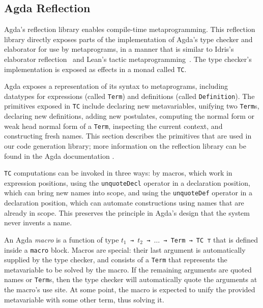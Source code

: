 \documentclass[runningheads]{llncs}
\begin{document}
\subsection{Agda Reflection}
\label{sec:sec2.2}
Agda's reflection library enables compile-time metaprogramming.
This reflection library directly exposes parts of the implementation of Agda's type checker and elaborator for use by metaprograms, in a manner that is similar to Idris's elaborator reflection~\cite{davidphd,David-2016} and Lean's tactic metaprogramming~\cite{Ebner2017}.
The type checker's implementation is exposed as effects in a monad called \texttt{TC}.

Agda exposes a representation of its syntax to metaprograms, including datatypes for expressions (called \texttt{Term}) and definitions (called \texttt{Definition}).
The primitives exposed in \texttt{TC} include declaring new metavariables, unifying two \texttt{Term}s, declaring new definitions, adding new postulates, computing the normal form or weak head normal form of a \texttt{Term}, inspecting the current context, and constructing fresh names.
This section describes the primitives that are used in our code generation library; more information on the reflection library can be found in the Agda documentation \cite{Agda-doc-2017}.

\texttt{TC} computations can be invoked in three ways: by macros, which work in expression positions, using the \texttt{unquoteDecl} operator in a declaration position, which can bring new names into scope, and using the \texttt{unquoteDef} operator in a declaration position, which can automate constructions using names that are already in scope.
This preserves the principle in Agda's design that the system never invents a name.

An Agda \emph{macro} is a function of type {\tt $t_1$ → $t_2$ → $\ldots$ → Term → TC ⊤} that is defined inside a \texttt{macro} block.
Macros are special: their last argument is automatically supplied by the type checker, and consists of a \texttt{Term} that represents the metavariable to be solved by the macro.
If the remaining arguments are quoted names or \texttt{Term}s, then the type checker will automatically quote the arguments at the macro's use site.
At some point, the macro is expected to unify the provided metavariable with some other term, thus solving it.
\end{document}
